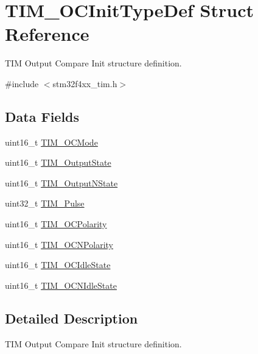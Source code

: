 \hypertarget{struct_t_i_m___o_c_init_type_def}{}\section{T\+I\+M\+\_\+\+O\+C\+Init\+Type\+Def Struct Reference}
\label{struct_t_i_m___o_c_init_type_def}


T\+IM Output Compare Init structure definition.  




{\ttfamily \#include $<$stm32f4xx\+\_\+tim.\+h$>$}

\subsection*{Data Fields}
\begin{DoxyCompactItemize}
\item 
uint16\+\_\+t \hyperlink{struct_t_i_m___o_c_init_type_def_afa69e616eb0b11bd238062dd8a5ceaa5}{T\+I\+M\+\_\+\+O\+C\+Mode}
\item 
uint16\+\_\+t \hyperlink{struct_t_i_m___o_c_init_type_def_a1e88e3081574da1e1abc089df87985ba}{T\+I\+M\+\_\+\+Output\+State}
\item 
uint16\+\_\+t \hyperlink{struct_t_i_m___o_c_init_type_def_a74a30f1a994c6676c0ce2b56243ed184}{T\+I\+M\+\_\+\+Output\+N\+State}
\item 
uint32\+\_\+t \hyperlink{struct_t_i_m___o_c_init_type_def_afd7020848ac0ad264aa3c4687f3c3ec4}{T\+I\+M\+\_\+\+Pulse}
\item 
uint16\+\_\+t \hyperlink{struct_t_i_m___o_c_init_type_def_acc7066b59671f62f2696c382c879c9c8}{T\+I\+M\+\_\+\+O\+C\+Polarity}
\item 
uint16\+\_\+t \hyperlink{struct_t_i_m___o_c_init_type_def_aa392739b843a7974702c5ec71864f982}{T\+I\+M\+\_\+\+O\+C\+N\+Polarity}
\item 
uint16\+\_\+t \hyperlink{struct_t_i_m___o_c_init_type_def_afb328e9ef4de6eb9d78390d7366b9a6e}{T\+I\+M\+\_\+\+O\+C\+Idle\+State}
\item 
uint16\+\_\+t \hyperlink{struct_t_i_m___o_c_init_type_def_a68f0241aa8d57bb42cd8e56c153f8e48}{T\+I\+M\+\_\+\+O\+C\+N\+Idle\+State}
\end{DoxyCompactItemize}


\subsection{Detailed Description}
T\+IM Output Compare Init structure definition. 

